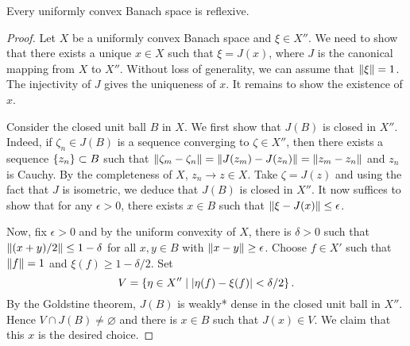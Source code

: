 \begin{theorem}
    Every uniformly convex Banach space is reflexive.
\end{theorem}
\begin{proof}
    Let $X$ be a uniformly convex Banach space and $\xi\in X''$. 
    We need to show that there exists a unique $x\in X$ such that 
    $\xi = J(x)$, where $J$ is the canonical mapping from $X$ to 
    $X''$. Without loss of generality, we can assume that 
    $\left\lVert {\xi} \right\rVert= 1$. The injectivity of $J$ gives the uniqueness 
    of $x$. It remains to show the existence of $x$. 

    Consider the closed unit ball $B$ in $X$. 
    We first show that $J(B)$ is closed in $X''$. Indeed, if 
    $\zeta_n\in J(B)$ is a sequence converging to $\zeta\in X''$, then 
    there exists a sequence $\left\{ {z_n} \right\}\subset B$ such that 
    $\left\lVert {\zeta_m - \zeta_n} \right\rVert = \left\lVert {J(z_m)-J(z_n)} \right\rVert = \left\lVert {z_m-z_n} \right\rVert$ and 
    $z_n$ is Cauchy. By the completeness of $X$, $z_n\to z\in X$. 
    Take $\zeta = J(z)$ and using the fact that $J$ is isometric, 
    we deduce that $J(B)$ is closed in $X''$. It now suffices to 
    show that for any $\epsilon>0$, there exists $x\in B$ such that 
    $\left\lVert {\xi - J(x)} \right\rVert \leq \epsilon$. 

    Now, fix $\epsilon>0$ and by the uniform convexity of $X$, there 
    is $\delta>0$ such that $\left\lVert {(x+y)/2} \right\rVert \leq 1-\delta$ for all $x,y\in B$ 
    with $\left\lVert {x-y} \right\rVert\geq\epsilon$. Choose $f\in X'$ such that $\left\lVert {f} \right\rVert = 1$ 
    and $\xi(f) \geq 1-\delta/2$. Set 
    \begin{equation*}
        V = \left\{ \eta\in X'' \;\middle\vert\; \left\lvert {\eta(f) - \xi(f)} \right\rvert<\delta/2 \right\}.
    \end{equation*}
    By the Goldstine theorem, $J(B)$ is weakly* dense in the closed unit ball in $X''$. 
    Hence $V\cap J(B)\neq\varnothing$ and there is $x\in B$ such that $J(x)\in V$. 
    We claim that this $x$ is the desired choice. 


\end{proof}

